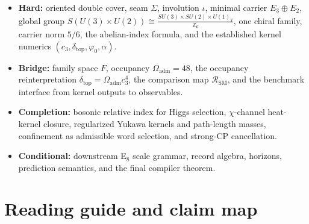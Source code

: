 \documentclass[11pt,a4paper]{article}
\theoremstyle{definition}
\theoremstyle{remark}
\newcommand{\Seam}{\Sigma}
\newcommand{\inv}{\iota}
\newcommand{\cthree}{c_3}
\newcommand{\phiz}{\varphi_0}
\newcommand{\deltatop}{\delta_{\mathrm{top}}}
\newcommand{\SM}{\mathrm{SM}}
\newcommand{\Oadm}{\Omega_{\mathrm{adm}}}
\begin{document}
\begin{tcolorbox}[colback=gray!5, colframe=gray!60, breakable,
    title={\textbf{Reading Status for the Present Paper}}, fonttitle=\bfseries]
\begin{itemize}[leftmargin=1.5em, topsep=3pt, itemsep=3pt]
    \item \textbf{Hard:} oriented double cover, seam $\Seam$, involution $\inv$, minimal carrier $E_3\oplus E_2$, global group $S(U(3)\times U(2))\cong \frac{SU(3)\times SU(2)\times U(1)_Y}{\mathbb Z_6}$, one chiral family, carrier norm $5/6$, the abelian-index formula, and the established kernel numerics $(\cthree,\deltatop,\phiz,\alpha)$.
    \item \textbf{Bridge:} family space $F$, occupancy $\Oadm=48$, the occupancy reinterpretation $\deltatop=\Oadm\cthree^4$, the comparison map $\mathcal R_{\SM}$, and the benchmark interface from kernel outputs to observables.
    \item \textbf{Completion:} bosonic relative index for Higgs selection, $\chi$-channel heat-kernel closure, regularized Yukawa kernels and path-length masses, confinement as admissible word selection, and strong-CP cancellation.
    \item \textbf{Conditional:} downstream E$_8$ scale grammar, record algebra, horizons, prediction semantics, and the final compiler theorem.
\end{itemize}
\end{tcolorbox}

\tableofcontents

\section{Reading guide and claim map}
\end{document}
